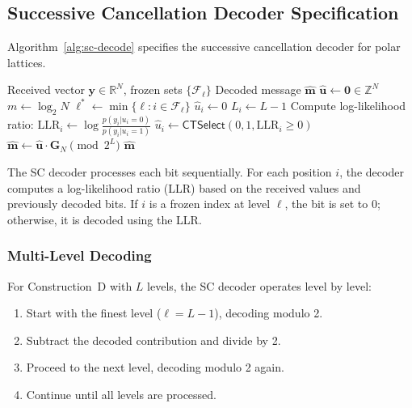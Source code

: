 \documentclass[11pt,a4paper]{article}
\newcommand{\CTSelect}{\textsf{CTSelect}\xspace}
\newcommand{\Z}{\mathbb{Z}}
\newcommand{\R}{\mathbb{R}}
\DeclareMathOperator{\polarScDec}{PolarSCDecode}
\begin{document}
\subsection{Successive Cancellation Decoder Specification}\label{sec:sc-decoder}

Algorithm~\ref{alg:sc-decode} specifies the successive cancellation decoder for polar lattices.

\begin{algorithm}[H]
\caption{$\polarScDec(\mathbf{y}, \{\mathcal{F}_\ell\}_{\ell=0}^{L-1})$}
\label{alg:sc-decode}
\begin{algorithmic}[1]
\REQUIRE Received vector $\mathbf{y} \in \R^N$, frozen sets $\{\mathcal{F}_\ell\}$
\ENSURE Decoded message $\widehat{\mathbf{m}}$
\STATE $\widehat{\mathbf{u}} \gets \mathbf{0} \in \Z^N$
\STATE $m \gets \log_2 N$
    \STATE $\ell^* \gets \min\{\ell : i \in \mathcal{F}_\ell\}$ 
        \STATE $\widehat{u}_i \gets 0$ 
    \ELSE
        \STATE $L_i \gets L - 1$ 
        \STATE Compute log-likelihood ratio: $\text{LLR}_i \gets \log \frac{p(y_i | u_i = 0)}{p(y_i | u_i = 1)}$
        \STATE $\widehat{u}_i \gets \CTSelect(0, 1, \text{LLR}_i \geq 0)$
    \ENDIF
\ENDFOR
\STATE {}
\STATE $\widehat{\mathbf{m}} \gets \widehat{\mathbf{u}} \cdot \mathbf{G}_N \pmod{2^L}$
\RETURN $\widehat{\mathbf{m}}$
\end{algorithmic}
\end{algorithm}

The SC decoder processes each bit sequentially. For each position $i$, the decoder computes a log-likelihood ratio (LLR) based on the received values and previously decoded bits. If $i$ is a frozen index at level $\ell$, the bit is set to 0; otherwise, it is decoded using the LLR.

\subsubsection{Multi-Level Decoding}

For Construction~D with $L$ levels, the SC decoder operates level by level:

\begin{enumerate}[leftmargin=2em]
\item Start with the finest level ($\ell = L-1$), decoding modulo 2.
\item Subtract the decoded contribution and divide by 2.
\item Proceed to the next level, decoding modulo 2 again.
\item Continue until all levels are processed.
\end{enumerate}
\end{document}
